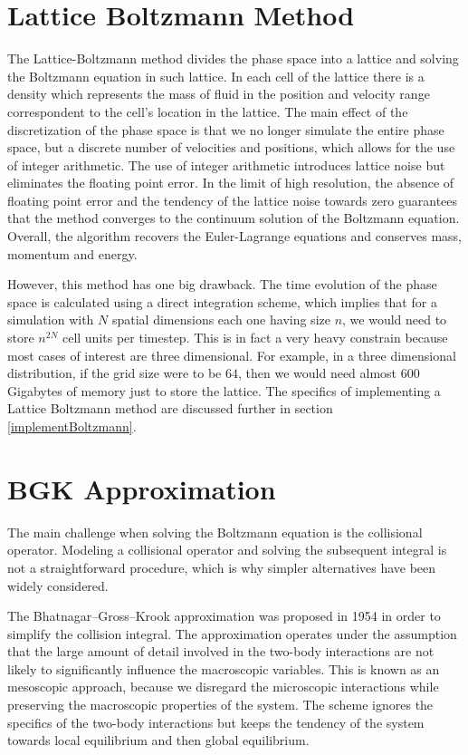 \section{Lattice Boltzmann Method}
\label{boltz}
The Lattice-Boltzmann method divides the phase space into a lattice and solving the Boltzmann equation in such lattice.
In each cell of the lattice there is a density which represents the mass of fluid in the position and velocity range correspondent to the cell's location in the lattice.
The main effect of the discretization of the phase space is that we no longer simulate the entire phase space, but a discrete number of velocities and positions, which allows for the use of integer arithmetic. The use of integer arithmetic introduces lattice noise but eliminates the floating point error. In the limit of high resolution, the absence of floating point error and the tendency of the lattice noise towards zero guarantees that the method converges to the continuum solution of the Boltzmann equation. Overall, the algorithm recovers the Euler-Lagrange equations and conserves mass, momentum and energy.

However, this method has one big drawback. The time evolution of the phase space is calculated using a direct integration scheme, which implies that for a simulation with $N$ spatial dimensions each one having size $n$, we would need to store $n^{2N}$ cell units per timestep. This is in fact a very heavy constrain because most cases of interest are three dimensional. For example, in a three dimensional distribution, if the grid size were to be $64$, then we would need almost 600 Gigabytes of memory just to store the lattice. 
The specifics of implementing a Lattice Boltzmann method are discussed further in section \ref{implementBoltzmann}.



\section{BGK Approximation}
\label{bgk}
The main challenge when solving the Boltzmann equation is the collisional operator. Modeling a collisional operator and solving the subsequent integral is not a straightforward procedure, which is why simpler alternatives have been widely considered.

The Bhatnagar–Gross–Krook approximation was proposed in 1954 \cite{1954PhRv...94..511B} in order to simplify the collision integral.
The approximation operates under the assumption that the large amount of detail involved in the two-body interactions are not likely to significantly influence the macroscopic variables\cite{asinari}.
This is known as an mesoscopic approach, because we disregard the microscopic interactions while preserving the macroscopic properties of the system. 
The scheme ignores the specifics of the two-body interactions but keeps the tendency of the system towards local equilibrium and then global equilibrium.

